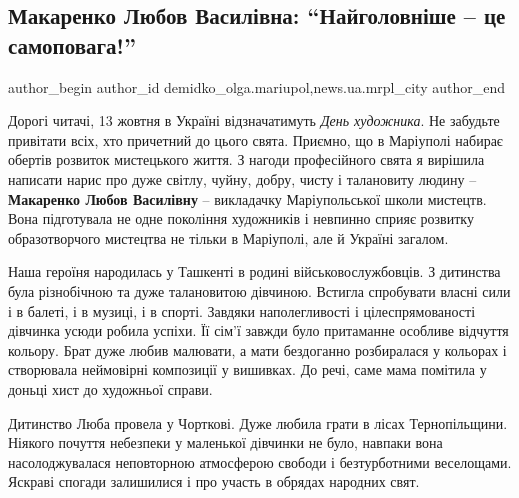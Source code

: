  
 
 
 
 
 
\subsection{Макаренко Любов Василівна: \enquote{Найголовніше – це самоповага!}}
\label{sec:11_10_2019.stz.news.ua.mrpl_city.1.makarenko_ljubov_vasylivna_najgolov_samopovaga}
 
\ifcmt
 author_begin
   author_id demidko_olga.mariupol,news.ua.mrpl_city
 author_end
\fi


Дорогі читачі, 13 жовтня в Україні відзначатимуть \emph{День художника}. Не забудьте
привітати всіх, хто причетний до цього свята. Приємно, що в Маріуполі набирає
обертів розвиток мистецького життя. З нагоди професійного свята я вирішила
написати нарис про дуже світлу, чуйну, добру, чисту і талановиту людину –
\textbf{Макаренко Любов Василівну} – викладачку Маріупольської школи мистецтв. Вона
підготувала не одне покоління художників і невпинно сприяє розвитку
образотворчого мистецтва не тільки в Маріуполі, але й Україні загалом.

Наша героїня народилась у Ташкенті в родині військовослужбовців. З дитинства
була різнобічною та дуже талановитою дівчиною. Встигла спробувати власні сили і
в балеті, і в музиці, і в спорті. Завдяки наполегливості і цілеспрямованості
дівчинка усюди робила успіхи. Її сім'ї завжди було притаманне особливе відчуття
кольору. Брат дуже любив малювати, а мати бездоганно розбиралася у кольорах і
створювала неймовірні композиції у вишивках. До речі, саме мама помітила у
доньці хист до художньої справи.

Дитинство Люба провела у Чорткові. Дуже любила грати в лісах Тернопільщини.
Ніякого почуття небезпеки у маленької дівчинки не було, навпаки вона
насолоджувалася неповторною атмосферою свободи і безтурботними веселощами.
Яскраві спогади залишилися і про участь в обрядах народних свят.

